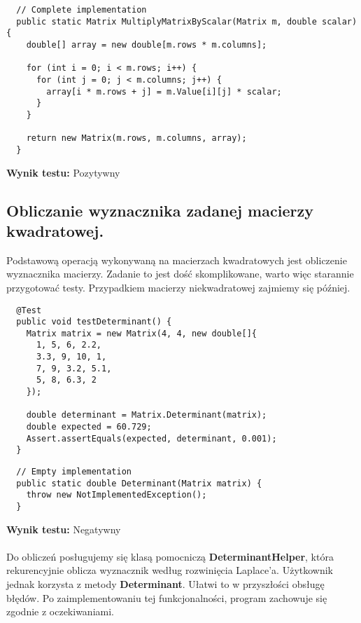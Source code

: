 \documentclass[a4paper,12pt,twoside]{article}
\begin{document}
\begin{lstlisting}
  // Complete implementation
  public static Matrix MultiplyMatrixByScalar(Matrix m, double scalar) {
    double[] array = new double[m.rows * m.columns];

    for (int i = 0; i < m.rows; i++) {
      for (int j = 0; j < m.columns; j++) {
        array[i * m.rows + j] = m.Value[i][j] * scalar;
      }
    }

    return new Matrix(m.rows, m.columns, array);
  }
\end{lstlisting}
\medskip

\noindent
\textbf{Wynik testu: }{\color{green} Pozytywny}


\subsection{Obliczanie wyznacznika zadanej macierzy kwadratowej.}
\bigskip

Podstawową operacją wykonywaną na macierzach kwadratowych jest obliczenie
wyznacznika macierzy. Zadanie to jest dość skomplikowane, warto więc starannie przygotować
testy. Przypadkiem macierzy niekwadratowej zajmiemy się później.\\

\begin{lstlisting}
  @Test
  public void testDeterminant() {
    Matrix matrix = new Matrix(4, 4, new double[]{
      1, 5, 6, 2.2,
      3.3, 9, 10, 1,
      7, 9, 3.2, 5.1,
      5, 8, 6.3, 2
    });

    double determinant = Matrix.Determinant(matrix);
    double expected = 60.729;
    Assert.assertEquals(expected, determinant, 0.001);
  }
\end{lstlisting}

\begin{lstlisting}
  // Empty implementation
  public static double Determinant(Matrix matrix) {
    throw new NotImplementedException();
  }
\end{lstlisting}
\medskip

\noindent
\textbf{Wynik testu: }{\color{red} Negatywny}\\\\
Do obliczeń posługujemy się klasą pomocniczą \textbf{DeterminantHelper}, która rekurencyjnie oblicza wyznacznik
według rozwinięcia Laplace'a. Użytkownik jednak korzysta z metody \textbf{Determinant}. Ułatwi to w przyszłości
obsługę błędów. Po zaimplementowaniu tej funkcjonalności, program zachowuje się zgodnie z oczekiwaniami.\\
\end{document}
